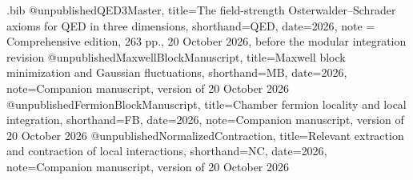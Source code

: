 \begin{filecontents*}[overwrite]{\jobname.bib}
@unpublished{QED3Master,
 title={The field-strength {Osterwalder--Schrader} axioms for {QED} in three dimensions},
 shorthand={QED}, date={2026}, note = {Comprehensive edition, 263 pp., 20 October 2026, before the modular integration revision}}
@unpublished{MaxwellBlockManuscript,
 title={Maxwell block minimization and Gaussian fluctuations},
 shorthand={MB}, date={2026}, note={Companion manuscript, version of 20 October 2026}}
@unpublished{FermionBlockManuscript,
 title={Chamber fermion locality and local integration},
 shorthand={FB}, date={2026}, note={Companion manuscript, version of 20 October 2026}}
@unpublished{NormalizedContraction,
 title={Relevant extraction and contraction of local interactions},
 shorthand={NC}, date={2026}, note={Companion manuscript, version of 20 October 2026}}
\end{filecontents*}
\documentclass[11pt,letterpaper,reqno]{amsart}
\makeatletter
{}[2020/10/01]

\RequirePackage[T1]{fontenc}
\RequirePackage{lmodern}
\RequirePackage{microtype}
\RequirePackage[letterpaper,margin=1in,headheight=15pt]{geometry}
\RequirePackage{amsmath,amsthm,amssymb,mathtools}
\RequirePackage{enumitem}
\RequirePackage{perpage}
\RequirePackage{xcolor}
\RequirePackage[breaklinks=true,colorlinks=true,
  linkcolor=manuscriptred,citecolor=manuscriptblue,urlcolor=manuscriptmagenta]{hyperref}
\RequirePackage{cleveref}

\setcounter{tocdepth}{1}
\renewcommand{\thefigure}{\Roman{figure}}
\renewcommand{\thetable}{\Roman{table}}
\renewcommand{\thefootnote}{%
  \ifnum\value{footnote}>9\arabic{footnote}\else\fnsymbol{footnote}\fi}

\theoremstyle{definition}
\newtheorem{ms@theorem}{Theorem}
\renewcommand{\thems@theorem}{\Alph{ms@theorem}}
\newtheorem*{ms@theoremstar}{Theorem}
\newtheorem{ms@proposition}{Proposition}[section]
\newtheorem{ms@lemma}[ms@proposition]{Lemma}
\newtheorem{ms@definition}[ms@proposition]{Definition}
\newtheorem{ms@corollary}[ms@proposition]{Corollary}
\newtheorem*{ms@corollarystar}{Corollary}

